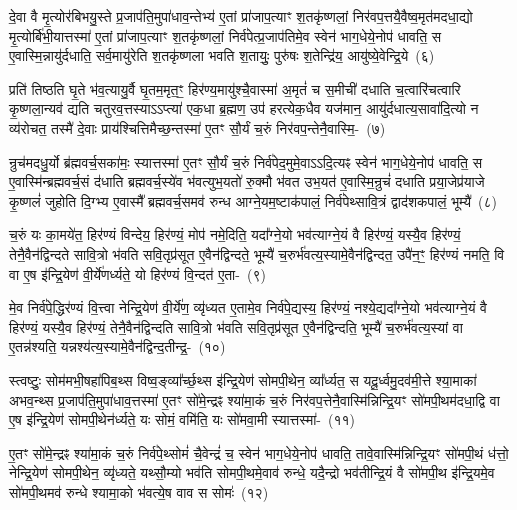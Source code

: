 {\anuvakamend[{धा॒रय॑द्वतो मरुतो गच्छति॒ विश॒मवै॒तद॒ष्टाद॑श च}]}

दे॒वा वै मृ॒त्योर॑बिभयु॒स्ते प्र॒जा\-प॑ति॒मुपा॑धाव॒न्तेभ्य॑ ए॒तां प्रा॑जाप॒त्याꣳ श॒तकृ॑ष्णलां॒ निर॑वप॒त्तयै॒वैष्व॒मृत॑मदधा॒द्यो मृ॒त्योर्बि॑भी॒यात्तस्मा॑ ए॒तां प्रा॑जाप॒त्याꣳ श॒तकृ॑ष्णलां॒ निर्व॑पेत्प्र॒जा\-प॑तिमे॒व स्वेन॑ भाग॒\-धेये॒नोप॑ धावति॒ स ए॒वास्मि॒न्नायु॑र्दधाति॒ सर्व॒मायु॑रेति श॒तकृ॑ष्णला भवति श॒तायुः॒ पुरु॑षः श॒तेन्द्रि॑य॒ आयु॑ष्ये॒वेन्द्रि॒ये~(६)\ip

प्रति॑ तिष्ठति घृ॒ते भ॑व॒त्यायु॒र्वै घृ॒तम॒मृत॒ꣳ॒ हिर॑ण्य॒मायु॑श्चै॒वा\-स्मा॑ अ॒मृतं॑ च स॒मीची॑ दधाति च॒त्वारि॑चत्वारि कृ॒ष्णला॒न्यव॑ द्यति चतुरव॒त्तस्या\-ऽऽ\-प्त्या॑ एक॒धा ब्र॒ह्मण॒ उप॑ हरत्येक॒धैव यज॑मान॒ आयु॑र्दधात्य॒सावा॑दि॒त्यो न व्य॑रोचत॒ तस्मै॑ दे॒वाः प्राय॑श्चित्ति\-मैच्छ॒न्तस्मा॑ ए॒तꣳ सौ॒र्यं च॒रुं निर॑वप॒न्तेनै॒वास्मि॒-~(७)\ip

न्रुच॑मदधु॒र्यो ब्र॑ह्मवर्च॒सका॑मः॒ स्यात्तस्मा॑ ए॒तꣳ सौ॒र्यं च॒रुं निर्व॑पेद॒मुमे॒वा\-ऽऽ\-दि॒त्यꣴ स्वेन॑ भाग॒\-धेये॒नोप॑ धावति॒ स ए॒वास्मि॑न्ब्रह्मवर्च॒सं द॑धाति ब्रह्मवर्च॒स्ये॑व भ॑वत्युभ॒यतो॑ रु॒क्मौ भ॑वत उभ॒यत॑ ए॒वास्मि॒न्रुचं॑ दधाति प्रया॒जेप्र॑याजे कृ॒ष्णलं॑ जुहोति दि॒ग्भ्य ए॒वास्मै᳚ ब्रह्मवर्च॒समव॑ रुन्ध आग्ने॒यम॒ष्टा\-क॑पालं॒ निर्व॑पेथ्सावि॒त्रं द्वाद॑श\-कपालं॒ भूम्यै॑~(८)\ip

च॒रुं यः का॒मये॑त॒ हिर॑ण्यं विन्देय॒ हिर॑ण्यं॒ मोप॑ नमे॒दिति॒ यदा᳚ग्ने॒यो भव॑त्याग्ने॒यं वै हिर॑ण्यं॒ यस्यै॒व हिर॑ण्यं॒ तेनै॒वैन॑द्विन्दते सावि॒त्रो भ॑वति सवि॒तृप्र॑सूत ए॒वैन॑द्विन्दते॒ भूम्यै॑ च॒रुर्भ॑वत्य॒स्यामे॒वैन॑द्विन्दत॒ उपै॑न॒ꣳ॒ हिर॑ण्यं नमति॒ वि वा ए॒ष इ॑न्द्रि॒येण॑ वी॒र्ये॑णर्ध्यते॒ यो हिर॑ण्यं वि॒न्दत॑ ए॒ता-~(९)\ip

मे॒व निर्व॑पे॒द्धिर॑ण्यं वि॒त्त्वा नेन्द्रि॒येण॑ वी॒र्ये॑ण॒ व्यृ॑ध्यत ए॒तामे॒व निर्व॑पे॒द्यस्य॒ हिर॑ण्यं॒ नश्ये॒द्यदा᳚ग्ने॒यो भव॑त्याग्ने॒यं वै हिर॑ण्यं॒ यस्यै॒व हिर॑ण्यं॒ तेनै॒वैन॑द्विन्दति सावि॒त्रो भ॑वति सवि॒तृप्र॑सूत ए॒वैन॑द्विन्दति॒ भूम्यै॑ च॒रुर्भ॑वत्य॒स्यां वा ए॒तन्न॑श्यति॒ यन्नश्य॑त्य॒स्यामे॒वैन॑द्विन्द॒ती\-न्द्र॒-~(१०)\ip

स्त्वष्टुः॒ सोम॑मभी॒षहा॑पिब॒थ्स विष्व॒ङ्व्या᳚र्च्छ॒थ्स इ॑न्द्रि॒येण॑ सोमपी॒थेन॒ व्या᳚र्ध्यत॒ स यदू॒र्ध्वमु॒दव॑मी॒त्ते श्या॒माका॑ अभव॒न्थ्स प्र॒जा\-प॑ति॒मुपा॑धाव॒त्तस्मा॑ ए॒तꣳ सो॑मे॒न्द्रꣴ श्या॑मा॒कं च॒रुं निर॑वप॒त्तेनै॒वास्मि॑न्निन्द्रि॒यꣳ सो॑मपी॒थम॑दधा॒द्वि वा ए॒ष इ॑न्द्रि॒येण॑ सोमपी॒थेन॑र्ध्यते॒ यः सोमं॒ वमि॑ति॒ यः सो॑मवा॒मी स्यात्तस्मा॑-~(११)\ip

ए॒तꣳ सो॑मे॒न्द्रꣴ श्या॑मा॒कं च॒रुं निर्व॑पे॒थ्सोमं॑ चै॒वेन्द्रं॑ च॒ स्वेन॑ भाग॒\-धेये॒नोप॑ धावति॒ तावे॒वास्मि॑न्निन्द्रि॒यꣳ सो॑मपी॒थं ध॑त्तो॒ नेन्द्रि॒येण॑ सोमपी॒थेन॒ व्यृ॑ध्यते॒ यथ्सौ॒म्यो भव॑ति सोमपी॒थमे॒वाव॑ रुन्धे॒ यदै॒न्द्रो भव॑तीन्द्रि॒यं वै सो॑मपी॒थ इ॑न्द्रि॒यमे॒व सो॑मपी॒थमव॑ रुन्धे श्यामा॒को भ॑वत्ये॒ष वाव स सोमः॑~(१२)\ip


